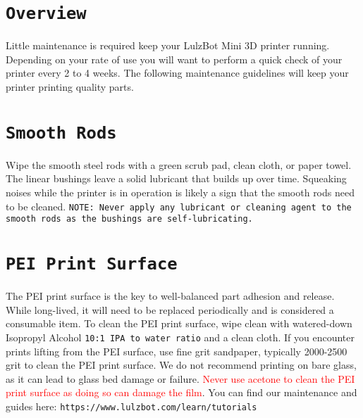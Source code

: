 %
%
%
%
%

\section{\texttt{Overview}}
Little maintenance is required keep your LulzBot\textsuperscript{\miniscule{\textregistered}} Mini 3D printer running. Depending on your rate of use you will want to perform a quick check of your printer every 2 to 4 weeks. The following maintenance guidelines will keep your printer printing quality parts.

\section{\texttt{Smooth Rods}}
Wipe the smooth steel rods with a green scrub pad, clean cloth, or paper towel. The linear bushings leave a solid lubricant that builds up over time. Squeaking noises while the printer is in operation is likely a sign that the smooth rods need to be cleaned. \texttt{NOTE: Never apply any lubricant or cleaning agent to the smooth rods as the bushings are self-lubricating.}


\section{\texttt{PEI Print Surface}}
The PEI print surface is the key to well-balanced part adhesion and release. While long-lived, it will need to be replaced periodically and is considered a consumable item. To clean the PEI print surface, wipe clean with watered-down Isopropyl Alcohol \texttt{10:1 IPA to water ratio} and a clean cloth. If you encounter prints lifting from the PEI surface, use fine grit sandpaper, typically 2000-2500 grit to clean the PEI print surface. We do not recommend printing on bare glass, as it can lead to glass bed damage or failure. \textcolor{red}{Never use acetone to clean the PEI print surface as doing so can damage the film}. You can find our maintenance and guides here:
\texttt{https://www.lulzbot.com/learn/tutorials}

